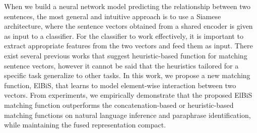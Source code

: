 When we build a neural network model predicting the relationship between two sentences, the most general and intuitive approach is to use a Siamese architecture, where the sentence vectors obtained from a shared encoder is given as input to a classifier. For the classifier to work effectively, it is important to extract appropriate features from the two vectors and feed them as input. There exist several previous works that suggest heuristic-based function for matching sentence vectors, however it cannot be said that the heuristics tailored for a specific task generalize to other tasks. In this work, we propose a new matching function, ElBiS, that learns to model element-wise interaction between two vectors. From experiments, we empirically demonstrate that the proposed ElBiS matching function outperforms the concatenation-based or heuristic-based matching functions on natural language inference and paraphrase identification, while maintaining the fused representation compact.
